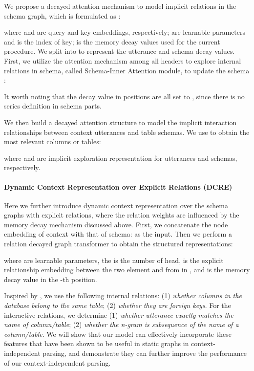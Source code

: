 \documentclass[letterpaper]{article} \usepackage{aaai21}  \usepackage{times}  \usepackage{helvet} \usepackage{courier}  \usepackage[hyphens]{url}  \usepackage{graphicx} \urlstyle{rm} \def\UrlFont{\rm}  \usepackage{natbib}  \usepackage{caption} \frenchspacing  \setlength{\pdfpagewidth}{8.5in}  \setlength{\pdfpageheight}{11in}
\begin{document}
We propose a decayed attention mechanism to model implicit relations in the schema graph, which is formulated as :

where  and  are query and key embeddings, respectively;  are learnable parameters and  is the index of key;  is the memory decay values used for the current procedure. We split  into  to represent the utterance and schema decay values.
First, we utilize the attention mechanism among all headers to explore internal relations in schema, called Schema-Inner Attention module, to update the schema  :

It worth noting that the decay value in  positions are all set to , since there is no series definition in schema parts.

We then build a decayed attention structure to model the implicit interaction relationships between context utterances and table schemas. We use   to obtain the most relevant columns or tables:


where  and  are implicit exploration representation for utterances and schemas, respectively.

\paragraph{Dynamic Context Representation over Explicit Relations (DCRE)}

Here we further introduce dynamic context representation over the schema graphs with explicit relations, where the relation weights are influenced by the memory decay mechanism discussed above.
First, we concatenate the node embedding of context with that of schema:  as the input. Then we perform a relation decayed graph transformer to obtain the structured representations:

where  are learnable parameters, the  is the number of head,  is the explicit relationship embedding between the two element  and  from  in , and  is the memory decay value in the -th position. 

Inspired by \citet{DBLP:conf/acl/WangSLPR20}, we use the following internal relations: (1) \textit{whether columns in the database belong to the same table}; (2) \textit{whether they are foreign keys}.
For the interactive relations, we determine (1) \textit{whether utterance exactly matches the name of column/table}; (2) \textit{whether the n-gram is subsequence of the name of a column/table}. 
We will show that our model can effectively incorporate these features that have been shown to be useful in static graphs in context-independent parsing, and demonstrate they can further improve the performance of our context-independent parsing.
\end{document}
